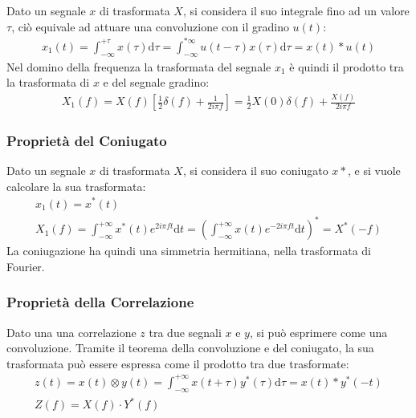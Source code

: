 \documentclass{article}
\newcommand{\df}{\mathrm{d}}
\numberwithin{equation}{subsection}
\begin{document}
Dato un segnale $x$ di trasformata $X$, si considera il suo integrale fino ad un valore $\tau$, ciò equivale ad attuare una convoluzione con il gradino $u(t)$:
\begin{gather*}
    x_1(t)=\displaystyle\int_{-\infty}^{+\tau}x(\tau)\df\tau=\int_{-\infty}^{*\infty}u(t-\tau)x(\tau)\df\tau=x(t)*u(t)
\end{gather*}
Nel domino della frequenza la trasformata del segnale $x_1$ è quindi il prodotto tra la trasformata di $x$ e del segnale gradino:
\begin{gather*}
    X_1(f)=X(f)\left[\displaystyle\frac{1}{2}\delta(f)+\frac{1}{2i\pi f}\right]=\frac{1}{2}X(0)\delta(f)+\frac{X(f)}{2i\pi f}
\end{gather*}

\subsubsection{Proprietà del Coniugato}

Dato un segnale $x$ di trasformata $X$, si considera il suo coniugato $x*$, e si vuole calcolare la sua trasformata:
\begin{gather*}
    x_1(t)=x^*(t)\\
    X_1(f)=\displaystyle\int_{-\infty}^{+\infty}x^*(t)e^{2i\pi ft}\df t=\left(\int_{-\infty}^{+\infty}x(t)e^{-2i\pi ft}\df t\right)^*=X^*(-f)
\end{gather*}
La coniugazione ha quindi una simmetria hermitiana, nella trasformata di Fourier. 

\subsubsection{Proprietà della Correlazione}

Dato una una correlazione $z$ tra due segnali $x$ e $y$, si può esprimere come una convoluzione. Tramite il teorema della convoluzione e del coniugato, la sua trasformata può 
essere espressa come il prodotto tra due trasformate: 
\begin{gather*}
    z(t)=x(t)\otimes y(t)=\displaystyle\int_{-\infty}^{+\infty}x(t+\tau)y^*(\tau)\df\tau=x(t)*y^*(-t)\\
    Z(f)=X(f)\cdot Y^*(f)
\end{gather*}
\end{document}
